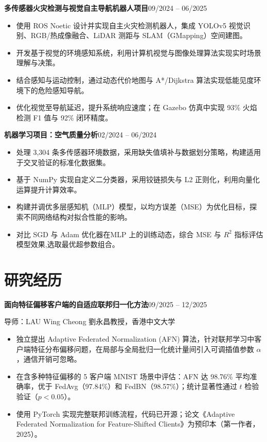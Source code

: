 \documentclass[a4paper,10pt]{article}
\newcommand{\entry}[2]{%
  \noindent\textbf{#1}\hfill#2\par%
}
\newcommand{\subline}[1]{%
  \noindent#1\par%
}
\begin{document}
\vspace{3pt}
\entry{多传感器火灾检测与视觉自主导航机器人项目}{09/2024 -- 06/2025}
\begin{itemize}
  \item 使用 ROS Noetic 设计并实现自主火灾检测机器人，集成 YOLOv5 视觉识别、RGB/热成像融合、LiDAR 测距与 SLAM（GMapping）空间建图。
  \item 开发基于视觉的环境感知系统，利用计算机视觉与图像处理算法实现实时场景理解与决策。
  \item 结合感知与运动控制，通过动态代价地图与 A*/Dijkstra 算法实现低能见度环境下的危险感知导航。
  \item 优化视觉至导航延迟，提升系统响应速度；在 Gazebo 仿真中实现 93\% 火焰检测 F1 值与 92\% 闭环精度。
\end{itemize}

\vspace{5pt}
\entry{机器学习项目：空气质量分析}{02/2024 -- 06/2024}
\begin{itemize}
  \item 处理 3,304 条多传感器环境数据，采用缺失值填补与数据划分策略，构建适用于交叉验证的标准化数据集。
  \item 基于 NumPy 实现自定义二分类器，采用铰链损失与 L2 正则化，利用向量化运算提升计算效率。
  \item 构建并调优多层感知机（MLP）模型，以均方误差（MSE）为优化目标，探索不同网络结构对拟合性能的影响。
  \item 对比 SGD 与 Adam 优化器在MLP 上的训练动态，综合 MSE 与 $R^2$ 指标评估模型效果,选取最优超参数组合。
\end{itemize}

\section*{研究经历}

\entry{面向特征偏移客户端的自适应联邦归一化方法}{09/2025 -- 12/2025}
\subline{导师：LAU Wing Cheong 劉永昌教授，香港中文大学}
\begin{itemize}
  \item 独立提出 Adaptive Federated Normalization (AFN) 算法，针对联邦学习中客户端特征分布偏移问题，在局部与全局批归一化统计量间引入可调插值参数 $\alpha$，通信开销可忽略。
  \item 在含多种特征偏移的 5 客户端 MNIST 场景中评估：AFN 达 98.76\% 平均准确率，优于 FedAvg（97.84\%）和 FedBN（98.57\%）；统计显著性通过 $t$ 检验验证（$p < 0.05$）。
  \item 使用 PyTorch 实现完整联邦训练流程，代码已开源；论文《Adaptive Federated Normalization for Feature-Shifted Clients》为预印本（第一作者，2025）。
\end{itemize}
\end{document}
